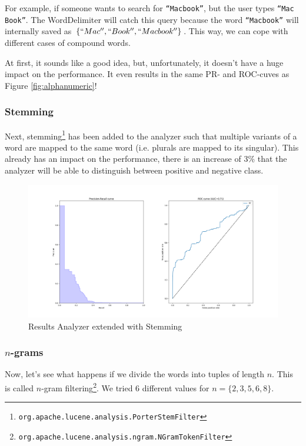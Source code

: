\documentclass[11pt]{article}
\begin{document}
For example, if someone wants to search for \texttt{``Macbook''}, but the user types \texttt{``Mac Book''}. The WordDelimiter will catch this query because the word \texttt{``Macbook''} will internally saved as $\{``Mac'', ``Book'', ``Macbook''\}$. This way, we can cope with different cases of compound words.

At first, it sounds like a good idea, but, unfortunately, it doesn't have a huge impact on the performance. It even results in the same PR- and ROC-cuves as Figure \ref{fig:alphanumeric}!

\subsubsection{Stemming}\label{sec:stemming}
Next, stemming\footnote{\texttt{org.apache.lucene.analysis.PorterStemFilter}} has been added to the analyzer such that multiple variants of a word are mapped to the same word (i.e. plurals are mapped to its singular). This already has an impact on the performance, there is an increase of 3\% that the analyzer will be able to distinguish between positive and negative class.

\begin{figure}[h!]
    \centering
    \includegraphics[width=\textwidth]{images/customAna-stem}
    \caption{Results Analyzer extended with Stemming}
    \label{fig:stemming}
\end{figure}

\subsubsection{$n$-grams}\label{sec:ngrams}
Now, let's see what happens if we divide the words into tuples of length $n$. This is called $n$-gram filtering\footnote{\texttt{org.apache.lucene.analysis.ngram.NGramTokenFilter}}. We tried 6 different values for $n = \{2, 3, 5, 6, 8\}$.
\end{document}
